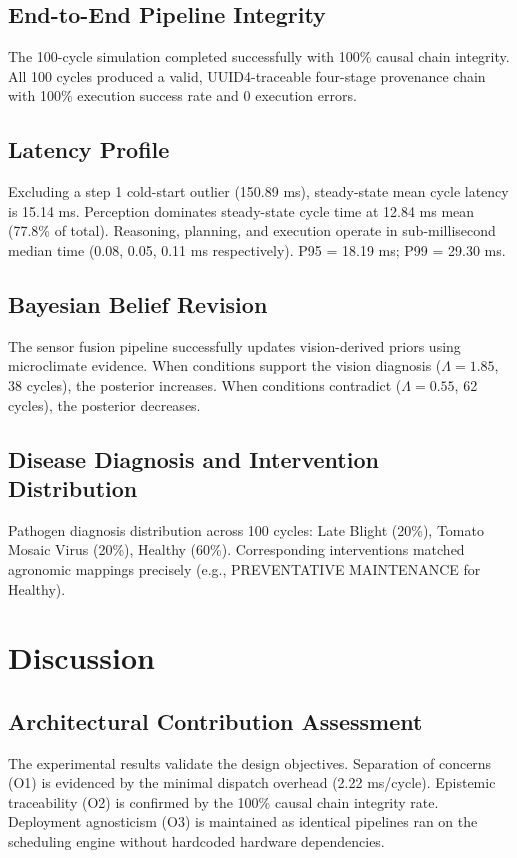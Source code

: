 \documentclass[journal, twocolumn]{IEEEtran}
\begin{document}
\subsection{End-to-End Pipeline Integrity}
The 100-cycle simulation completed successfully with 100\% causal chain integrity. All 100 cycles produced a valid, UUID4-traceable four-stage provenance chain with 100\% execution success rate and 0 execution errors.

\subsection{Latency Profile}
Excluding a step 1 cold-start outlier (150.89 ms), steady-state mean cycle latency is 15.14 ms. Perception dominates steady-state cycle time at 12.84 ms mean (77.8\% of total). Reasoning, planning, and execution operate in sub-millisecond median time (0.08, 0.05, 0.11 ms respectively). P95 = 18.19 ms; P99 = 29.30 ms.

\subsection{Bayesian Belief Revision}
The sensor fusion pipeline successfully updates vision-derived priors using microclimate evidence. When conditions support the vision diagnosis ($\Lambda = 1.85$, 38 cycles), the posterior increases. When conditions contradict ($\Lambda = 0.55$, 62 cycles), the posterior decreases. 

\subsection{Disease Diagnosis and Intervention Distribution}
Pathogen diagnosis distribution across 100 cycles: Late Blight (20\%), Tomato Mosaic Virus (20\%), Healthy (60\%). Corresponding interventions matched agronomic mappings precisely (e.g., PREVENTATIVE MAINTENANCE for Healthy).

\section{Discussion}
\subsection{Architectural Contribution Assessment}
The experimental results validate the design objectives. Separation of concerns (O1) is evidenced by the minimal dispatch overhead (2.22 ms/cycle). Epistemic traceability (O2) is confirmed by the 100\% causal chain integrity rate. Deployment agnosticism (O3) is maintained as identical pipelines ran on the scheduling engine without hardcoded hardware dependencies.
\end{document}
